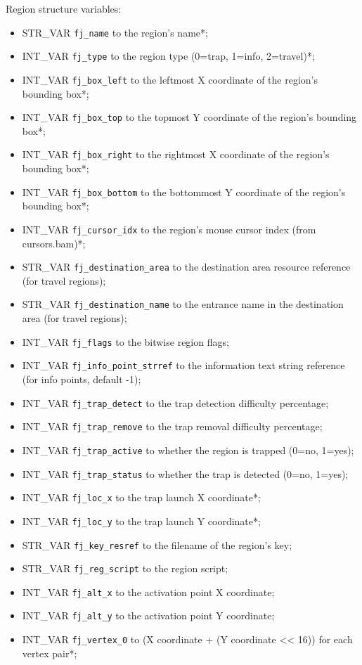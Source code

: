 \documentclass{article}
\begin{document}
Region structure variables:
\begin{itemize}
\item STR_VAR \verb+fj_name+ to the region's name*;
\item INT_VAR \verb+fj_type+ to the region type (0=trap, 1=info, 2=travel)*;
\item INT_VAR \verb+fj_box_left+ to the leftmost X coordinate of the region's bounding box*;
\item INT_VAR \verb+fj_box_top+ to the topmost Y coordinate of the region's bounding box*;
\item INT_VAR \verb+fj_box_right+ to the rightmost X coordinate of the region's bounding box*;
\item INT_VAR \verb+fj_box_bottom+ to the bottommost Y coordinate of the region's bounding box*;
\item INT_VAR \verb+fj_cursor_idx+ to the region's mouse cursor index (from cursors.bam)*;
\item STR_VAR \verb+fj_destination_area+ to the destination area resource reference (for travel regions);
\item STR_VAR \verb+fj_destination_name+ to the entrance name in the destination area (for travel regions);
\item INT_VAR \verb+fj_flags+ to the bitwise region flags;
\item INT_VAR \verb+fj_info_point_strref+ to the information text string reference (for info points, default -1);
\item INT_VAR \verb+fj_trap_detect+ to the trap detection difficulty percentage;
\item INT_VAR \verb+fj_trap_remove+ to the trap removal difficulty percentage;
\item INT_VAR \verb+fj_trap_active+ to whether the region is trapped (0=no, 1=yes);
\item INT_VAR \verb+fj_trap_status+ to whether the trap is detected (0=no, 1=yes);
\item INT_VAR \verb+fj_loc_x+ to the trap launch X coordinate*;
\item INT_VAR \verb+fj_loc_y+ to the trap launch Y coordinate*;
\item STR_VAR \verb+fj_key_resref+ to the filename of the region's key;
\item STR_VAR \verb+fj_reg_script+ to the region script;
\item INT_VAR \verb+fj_alt_x+ to the activation point X coordinate;
\item INT_VAR \verb+fj_alt_y+ to the activation point Y coordinate;
\item INT_VAR \verb+fj_vertex_0+ to (X coordinate + (Y coordinate << 16)) for each vertex pair*;
\end{itemize}
\end{document}
